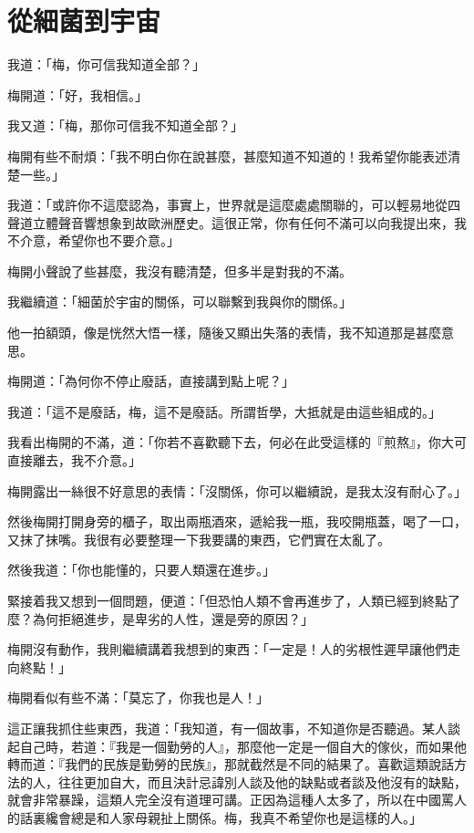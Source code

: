 \chapter{從細菌到宇宙}
我道：「梅，你可信我知道全部？」

梅開道：「好，我相信。」

我又道：「梅，那你可信我不知道全部？」

梅開有些不耐煩：「我不明白你在說甚麼，甚麼知道不知道的！我希望你能表述清楚一些。」

我道：「或許你不這麼認為，事實上，世界就是這麼處處關聯的，可以輕易地從四聲道立體聲音響想象到故歐洲歷史。這很正常，你有任何不滿可以向我提出來，我不介意，希望你也不要介意。」

梅開小聲說了些甚麼，我沒有聽清楚，但多半是對我的不滿。

我繼續道：「細菌於宇宙的關係，可以聯繫到我與你的關係。」

他一拍額頭，像是恍然大悟一樣，隨後又顯出失落的表情，我不知道那是甚麼意思。

梅開道：「為何你不停止廢話，直接講到點上呢？」

我道：「這不是廢話，梅，這不是廢話。所謂哲學，大抵就是由這些組成的。」

我看出梅開的不滿，道：「你若不喜歡聽下去，何必在此受這樣的『煎熬』，你大可直接離去，我不介意。」

梅開露出一絲很不好意思的表情：「沒關係，你可以繼續說，是我太沒有耐心了。」

然後梅開打開身旁的櫃子，取出兩瓶酒來，遞給我一瓶，我咬開瓶蓋，喝了一口，又抹了抹嘴。我很有必要整理一下我要講的東西，它們實在太亂了。

然後我道：「你也能懂的，只要人類還在進步。」

緊接着我又想到一個問題，便道：「但恐怕人類不會再進步了，人類已經到終點了麼？為何拒絕進步，是卑劣的人性，還是旁的原因？」

梅開沒有動作，我則繼續講着我想到的東西：「一定是！人的劣根性遲早讓他們走向終點！」

梅開看似有些不滿：「莫忘了，你我也是人！」

這正讓我抓住些東西，我道：「我知道，有一個故事，不知道你是否聽過。某人談起自己時，若道：『我是一個勤勞的人』，那麼他一定是一個自大的傢伙，而如果他轉而道：『我們的民族是勤勞的民族』，那就截然是不同的結果了。喜歡這類說話方法的人，往往更加自大，而且決計忌諱別人談及他的缺點或者談及他沒有的缺點，就會非常暴躁，這類人完全沒有道理可講。正因為這種人太多了，所以在中國罵人的話裏纔會總是和人家母親扯上關係。梅，我真不希望你也是這樣的人。」

